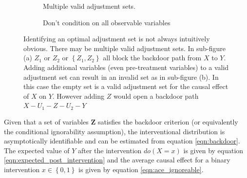 \documentclass[11pt,a4paper,twoside]{report}
\newcommand{\set}[1]{\left\{#1\right\}}
\theoremstyle{plain}
\theoremstyle{definition}
\begin{document}
\begin{figure}
\centering
\begin{subfigure}[t]{0.48\textwidth}
\centering
\caption{Multiple valid adjustment sets.}
\label{fig:adjust_multiple}
\end{subfigure}
\begin{subfigure}[t]{0.48\textwidth}
\centering
\caption{Don't condition on all observable variables}
\label{fig:m-graph}
\end{subfigure}
\caption{Identifying an optimal adjustment set is not always intuitively obvious. There may be multiple valid adjustment sets. In sub-figure (a) $Z_1$ or $Z_2$ or $\set{Z_1,Z_2}$ all block the backdoor path from $X$ to $Y$. Adding additional variables (even pre-treatment variables) to a valid adjustment set can result in an invalid set as in sub-figure (b). In this case the empty set is a valid adjustment set for the causal effect of $X$ on $Y$. However adding $Z$ would open a backdoor path $X-U_1-Z-U_2-Y$}
\label{fig:adjustment}
\end{figure}

Given that a set of variables $\boldsymbol{Z}$ satisfies the backdoor criterion (or equivalently the conditional ignorability assumption), the interventional distribution is asymptotically identifiable and can be estimated from equation \ref{eqn:backdoor}. The expected value of $Y$ after the intervention $do(X=x)$ is given by equation \ref{eqn:expected_post_intervention} and the average causal effect for a binary intervention $x \in \set{0,1}$ is given by equation \ref{eqn:ace_ignoreable}.
\end{document}
